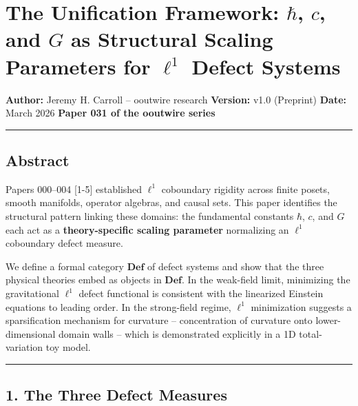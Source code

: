 \documentclass[
]{article}
\author{}
\date{}
\begin{document}
\section{\texorpdfstring{The Unification Framework: \(\hbar\), \(c\),
and \(G\) as Structural Scaling Parameters for \(\ell^1\) Defect
Systems}{The Unification Framework: \textbackslash hbar, c, and G as Structural Scaling Parameters for \textbackslash ell\^{}1 Defect Systems}}\label{the-unification-framework-hbar-c-and-g-as-structural-scaling-parameters-for-ell1-defect-systems}

\textbf{Author:} Jeremy H. Carroll -- ooutwire research
\textbf{Version:} v1.0 (Preprint) \textbf{Date:} March 2026
\textbf{Paper 031 of the ooutwire series}

\begin{center}\rule{0.5\linewidth}{0.5pt}\end{center}

\subsection{Abstract}\label{abstract}

Papers 000--004 {[}1-5{]} established \(\ell^1\) coboundary rigidity
across finite posets, smooth manifolds, operator algebras, and causal
sets. This paper identifies the structural pattern linking these
domains: the fundamental constants \(\hbar\), \(c\), and \(G\) each act
as a \textbf{theory-specific scaling parameter} normalizing an
\(\ell^1\) coboundary defect measure.

We define a formal category \(\mathbf{Def}\) of defect systems and show
that the three physical theories embed as objects in \(\mathbf{Def}\).
In the weak-field limit, minimizing the gravitational \(\ell^1\) defect
functional is consistent with the linearized Einstein equations to
leading order. In the strong-field regime, \(\ell^1\) minimization
suggests a sparsification mechanism for curvature -- concentration of
curvature onto lower-dimensional domain walls -- which is demonstrated
explicitly in a 1D total-variation toy model.

\begin{center}\rule{0.5\linewidth}{0.5pt}\end{center}

\subsection{1. The Three Defect
Measures}\label{the-three-defect-measures}
\end{document}
